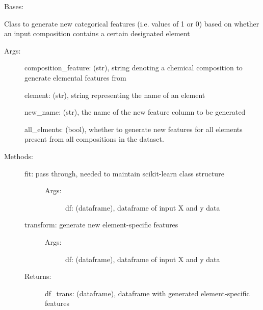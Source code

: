 \documentclass[letterpaper,10pt,english]{sphinxmanual}
\begin{document}
\begin{fulllineitems}
\label{\detokenize{api/mastml.feature_generators.OneHotElementEncoder:mastml.feature_generators.OneHotElementEncoder}}
Bases: {\hyperref[\detokenize{api/mastml.feature_generators.BaseGenerator:mastml.feature_generators.BaseGenerator}]{}}

Class to generate new categorical features (i.e. values of 1 or 0) based on whether an input composition contains a
certain designated element
\begin{description}
\item[{Args:}] \leavevmode
composition\_feature: (str), string denoting a chemical composition to generate elemental features from

element: (str), string representing the name of an element

new\_name: (str), the name of the new feature column to be generated

all\_elments: (bool), whether to generate new features for all elements present from all compositions in the dataset.

\item[{Methods:}] \leavevmode\begin{description}
\item[{fit: pass through, needed to maintain scikit-learn class structure}] \leavevmode\begin{description}
\item[{Args:}] \leavevmode
df: (dataframe), dataframe of input X and y data

\end{description}

\item[{transform: generate new element-specific features}] \leavevmode\begin{description}
\item[{Args:}] \leavevmode
df: (dataframe), dataframe of input X and y data

\end{description}

\item[{Returns:}] \leavevmode
df\_trans: (dataframe), dataframe with generated element-specific features


\end{description}
\end{description}
\end{fulllineitems}
\end{document}
